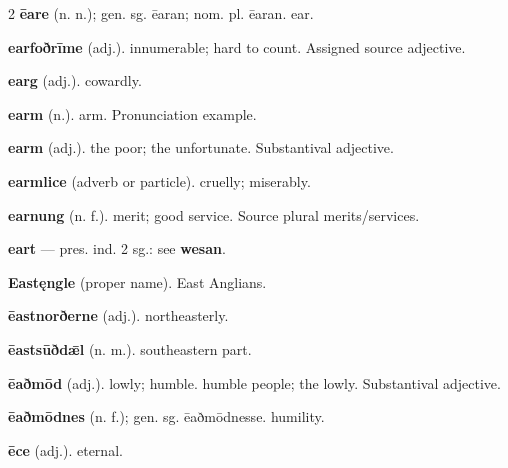 \begin{multicols*}{2}
\textbf{ēare} (n. n.); gen. sg. ēaran; nom. pl. ēaran. ear.\par
\textbf{earfoðrīme} (adj.). innumerable; hard to count. Assigned source adjective.\par
\textbf{earg} (adj.). cowardly.\par
\textbf{earm} (n.). arm. Pronunciation example.\par
\textbf{earm} (adj.). the poor; the unfortunate. Substantival adjective.\par
\textbf{earmlice} (adverb or particle). cruelly; miserably.\par
\textbf{earnung} (n. f.). merit; good service. Source plural merits/services.\par
\textbf{eart} — pres. ind. 2 sg.: see \textbf{wesan}.\par
\textbf{Eastęngle} (proper name). East Anglians.\par
\textbf{ēastnorðerne} (adj.). northeasterly.\par
\textbf{ēastsūðdǣl} (n. m.). southeastern part.\par
\textbf{ēaðmōd} (adj.). lowly; humble. humble people; the lowly. Substantival adjective.\par
\textbf{ēaðmōdnes} (n. f.); gen. sg. ēaðmōdnesse. humility.\par
\textbf{ēce} (adj.). eternal.\par

\end{multicols*}
